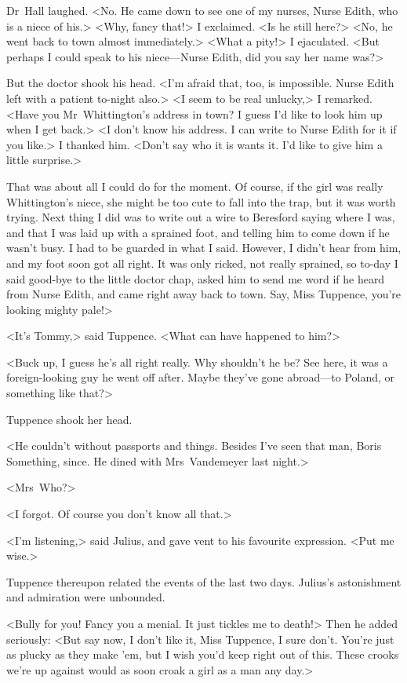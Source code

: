 Dr~Hall laughed. <No. He came down to see one of my nurses, Nurse Edith, who is a niece of his.> <Why, fancy that!> I exclaimed. <Is he still here?> <No, he went back to town almost immediately.> <What a pity!> I ejaculated. <But perhaps I could speak to his niece—Nurse Edith, did you say her name was?>

But the doctor shook his head. <I'm afraid that, too, is impossible. Nurse Edith left with a patient to-night also.> <I seem to be real unlucky,> I remarked. <Have you Mr~Whittington's address in town? I guess I'd like to look him up when I get back.> <I don't know his address. I can write to Nurse Edith for it if you like.> I thanked him. <Don't say who it is wants it. I'd like to give him a little surprise.>

That was about all I could do for the moment. Of course, if the girl was really Whittington's niece, she might be too cute to fall into the trap, but it was worth trying. Next thing I did was to write out a wire to Beresford saying where I was, and that I was laid up with a sprained foot, and telling him to come down if he wasn't busy. I had to be guarded in what I said. However, I didn't hear from him, and my foot soon got all right. It was only ricked, not really sprained, so to-day I said good-bye to the little doctor chap, asked him to send me word if he heard from Nurse Edith, and came right away back to town. Say, Miss Tuppence, you're looking mighty pale!>

<It's Tommy,> said Tuppence. <What can have happened to him?>

<Buck up, I guess he's all right really. Why shouldn't he be? See here, it was a foreign-looking guy he went off after. Maybe they've gone abroad—to Poland, or something like that?>

Tuppence shook her head.

<He couldn't without passports and things. Besides I've seen that man, Boris Something, since. He dined with Mrs~Vandemeyer last night.>

<Mrs~Who?>

<I forgot. Of course you don't know all that.>

<I'm listening,> said Julius, and gave vent to his favourite expression. <Put me wise.>

Tuppence thereupon related the events of the last two days. Julius's astonishment and admiration were unbounded.

<Bully for you! Fancy you a menial. It just tickles me to death!> Then he added seriously: <But say now, I don't like it, Miss Tuppence, I sure don't. You're just as plucky as they make 'em, but I wish you'd keep right out of this. These crooks we're up against would as soon croak a girl as a man any day.>

